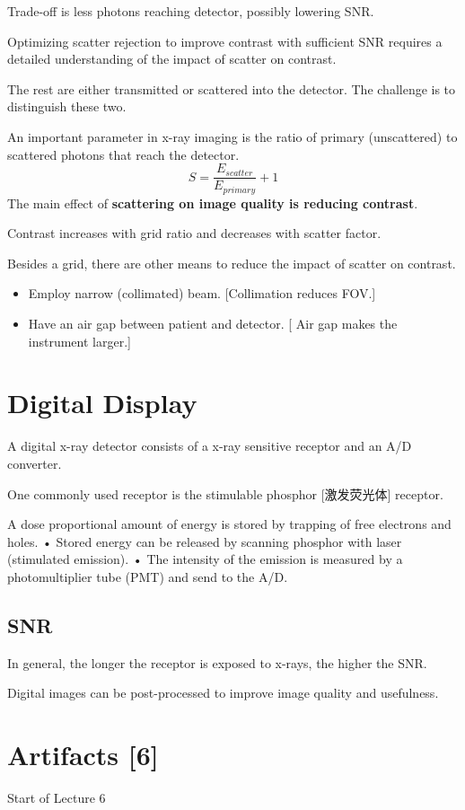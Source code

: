 \documentclass[UTF8,a4paper,11pt]{book}
\theoremstyle{mystyle}{
  \newtheorem{example}{Example}
}
\begin{document}
Trade-off is less photons reaching detector,
possibly lowering SNR.

 Optimizing scatter rejection to improve
contrast with sufficient SNR requires a
detailed understanding of the impact of
scatter on contrast.

 The rest are either transmitted or scattered
into the detector. The challenge is to distinguish these two.

 An important parameter in x-ray imaging is
the ratio of primary (unscattered) to scattered
photons that reach the detector.
\[
S = \frac{E_{scatter}}{E_{primary}}+1
\]  
The main effect of \textbf{scattering on image quality
is reducing contrast}.

 Contrast increases with grid ratio and
decreases with scatter factor.

Besides a grid, there are other means to
reduce the impact of scatter on contrast.
\begin{itemize}
\item Employ narrow (collimated) beam. [Collimation reduces FOV.]
\item  Have an air gap between patient and detector. [ Air gap makes the instrument larger.]
\end{itemize}

\section{Digital Display}
 A digital x-ray detector consists of a x-ray
sensitive receptor and an A/D converter.

One commonly used receptor is the
stimulable phosphor [激发荧光体] receptor.

A dose proportional amount of energy is
stored by trapping of free electrons and holes.
• Stored energy can be released by scanning
phosphor with laser (stimulated emission).
• The intensity of the emission is measured by a
photomultiplier tube (PMT) and send to the
A/D.

\subsection{SNR}
 In general, the longer the receptor is exposed
to x-rays, the higher the SNR.

 Digital images can be post-processed to
improve image quality and usefulness.

\section{Artifacts [6]}
{\sf Start of Lecture 6}
\end{document}
